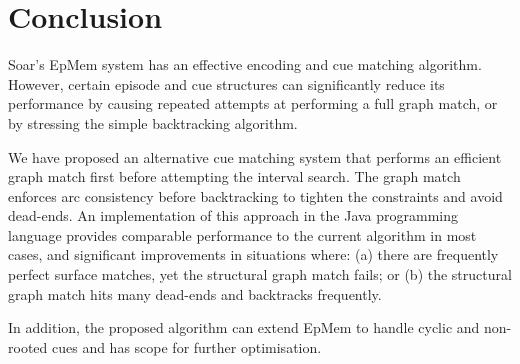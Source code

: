 \documentclass[envcountsame]{llncs}
\begin{document}
\section{Conclusion}
  
  Soar's EpMem system has an effective encoding and cue matching algorithm.
  However, certain episode and cue structures can significantly reduce its performance by causing repeated attempts at performing a full graph match, or by stressing the simple backtracking algorithm.

  We have proposed an alternative cue matching system that performs an efficient graph match first before attempting the interval search.
  The graph match enforces arc consistency before backtracking to tighten the constraints and avoid dead-ends.
  An implementation of this approach in the Java programming language provides comparable performance to the current algorithm in most cases, and significant improvements in situations where: (a) there are frequently perfect surface matches, yet the structural graph match fails;
  or (b) the structural graph match hits many dead-ends and backtracks frequently.

  In addition, the proposed algorithm can extend EpMem to handle cyclic and non-rooted cues and has scope for further optimisation.



\end{document}
